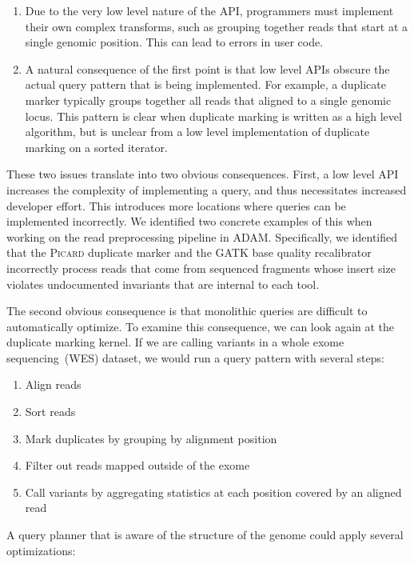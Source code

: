 \documentclass[phd]{ucbthesis}
\begin{document}
\begin{enumerate}
\item Due to the very low level nature of the API, programmers must implement
  their own complex transforms, such as grouping together reads that start at a
  single genomic position. This can lead to errors in user code.
\item A natural consequence of the first point is that low level APIs obscure
  the actual query pattern that is being implemented. For example, a duplicate
  marker typically groups together all reads that aligned to a single genomic
  locus. This pattern is clear when duplicate marking is written as a high
  level algorithm, but is unclear from a low level implementation of duplicate
  marking on a sorted iterator.
\end{enumerate}

These two issues translate into two obvious consequences. First, a low level API
increases the complexity of implementing a query, and thus necessitates increased
developer effort. This introduces more locations where queries can be
implemented incorrectly. We identified two concrete examples of this when
working on the read preprocessing pipeline in \textsc{ADAM}. Specifically, we
identified that the \textsc{Picard} duplicate marker and the \textsc{GATK}
base quality recalibrator incorrectly process reads that come from sequenced
fragments whose insert size violates undocumented invariants that are internal
to each tool.

The second obvious consequence is that monolithic queries are difficult to
automatically optimize. To examine this consequence, we can look again at the
duplicate marking kernel. If we are calling variants in a whole exome
sequencing~(WES) dataset, we would run a query pattern with several steps:

\begin{enumerate}
\item Align reads
\item Sort reads
\item Mark duplicates by grouping by alignment position
\item Filter out reads mapped outside of the exome
\item Call variants by aggregating statistics at each position covered by an
  aligned read
\end{enumerate}

A query planner that is aware of the structure of the genome could apply several
optimizations:
\end{document}
